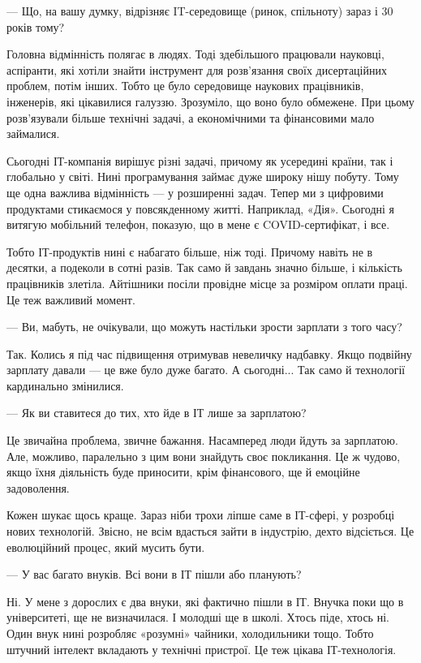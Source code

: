— Що, на вашу думку, відрізняє IT-середовище (ринок, спільноту) зараз і 30
років тому?

Головна відмінність полягає в людях. Тоді здебільшого працювали науковці,
аспіранти, які хотіли знайти інструмент для розв’язання своїх дисертаційних
проблем, потім інших. Тобто це було середовище наукових працівників, інженерів,
які цікавилися галуззю. Зрозуміло, що воно було обмежене. При цьому
розв’язували більше технічні задачі, а економічними та фінансовими мало
займалися.

Сьогодні ІТ-компанія вирішує різні задачі, причому як усередині країни, так і
глобально у світі. Нині програмування займає дуже широку нішу побуту. Тому ще
одна важлива відмінність — у розширенні задач. Тепер ми з цифровими продуктами
стикаємося у повсякденному житті. Наприклад, «Дія». Сьогодні я витягую
мобільний телефон, показую, що в мене є COVID-сертифікат, і все.

Тобто ІТ-продуктів нині є набагато більше, ніж тоді. Причому навіть не в
десятки, а подеколи в сотні разів. Так само й завдань значно більше, і
кількість працівників злетіла. Айтішники посіли провідне місце за розміром
оплати праці. Це теж важливий момент.


— Ви, мабуть, не очікували, що можуть настільки зрости зарплати з того часу?

Так. Колись я під час підвищення отримував невеличку надбавку. Якщо подвійну
зарплату давали — це вже було дуже багато. А сьогодні... Так само й технології
кардинально змінилися.

— Як ви ставитеся до тих, хто йде в ІТ лише за зарплатою?

Це звичайна проблема, звичне бажання. Насамперед люди йдуть за зарплатою. Але,
можливо, паралельно з цим вони знайдуть своє покликання. Це ж чудово, якщо їхня
діяльність буде приносити, крім фінансового, ще й емоційне задоволення.

Кожен шукає щось краще. Зараз ніби трохи ліпше саме в ІТ-сфері, у розробці
нових технологій. Звісно, не всім вдасться зайти в індустрію, дехто відсіється.
Це еволюційний процес, який мусить бути.

— У вас багато внуків. Всі вони в ІТ пішли або планують?

Ні. У мене з дорослих є два внуки, які фактично пішли в ІТ. Внучка поки що в
університеті, ще не визначилася. І молодші ще в школі. Хтось піде, хтось ні.
Один внук нині розробляє «розумні» чайники, холодильники тощо. Тобто штучний
інтелект вкладають у технічні пристрої. Це теж цікава ІТ-технологія.

